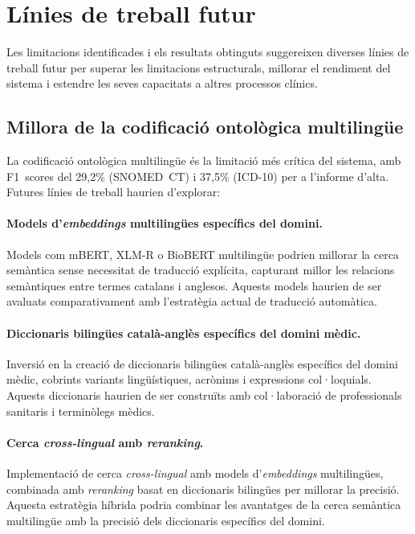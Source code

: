 \documentclass[CAT]{TFUOC}%
\begin{document}
\section{Línies de treball futur}

Les limitacions identificades i els resultats obtinguts suggereixen diverses línies de treball futur per superar les limitacions estructurals, millorar el rendiment del sistema i estendre les seves capacitats a altres processos clínics.

\subsection{Millora de la codificació ontològica multilingüe}

La codificació ontològica multilingüe és la limitació més crítica del sistema, amb F1~scores del 29,2\% (SNOMED~CT) i 37,5\% (ICD-10) per a l'informe d'alta. Futures línies de treball haurien d'explorar:

\paragraph{Models d'\textit{embeddings} multilingües específics del domini.}
Models com mBERT, XLM-R o BioBERT multilingüe podrien millorar la cerca semàntica sense necessitat de traducció explícita, capturant millor les relacions semàntiques entre termes catalans i anglesos. Aquests models haurien de ser avaluats comparativament amb l'estratègia actual de traducció automàtica.

\paragraph{Diccionaris bilingües català-anglès específics del domini mèdic.}
Inversió en la creació de diccionaris bilingües català-anglès específics del domini mèdic, cobrints variants lingüístiques, acrònims i expressions col·loquials. Aquests diccionaris haurien de ser construïts amb col·laboració de professionals sanitaris i terminòlegs mèdics.

\paragraph{Cerca \textit{cross-lingual} amb \textit{reranking}.}
Implementació de cerca \textit{cross-lingual} amb models d'\textit{embeddings} multilingües, combinada amb \textit{reranking} basat en diccionaris bilingües per millorar la precisió. Aquesta estratègia híbrida podria combinar les avantatges de la cerca semàntica multilingüe amb la precisió dels diccionaris específics del domini.
\end{document}
